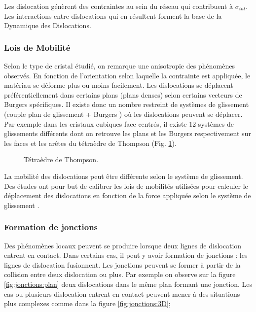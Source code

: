 \documentclass[11pt,class=article,float=false,crop=false]{standalone}
\begin{document}

Les dislocation génèrent des contraintes au sein du réseau qui contribuent à $\sigma _{int}$. Les interactions entre dislocations qui en résultent forment la base de la Dynamique des Dislocations.

\subsubsection{Lois de Mobilité}
Selon le type de cristal étudié, on remarque une anisotropie des phénomènes observés. En fonction de l'orientation selon laquelle la contrainte est appliquée, le matériau se déforme plus ou moins facilement. Les dislocations se déplacent préférentiellement dans certains plans (plans denses) selon certains vecteurs de Burgers spécifiques. Il existe donc un nombre restreint de systèmes de glissement (couple plan de glissement + Burgers ) où les dislocations peuvent se déplacer. Par exemple dans les cristaux cubiques face centrés, il existe 12 systèmes de glissements différents dont on retrouve les plans et les Burgers respectivement sur les faces et les arêtes du tétraèdre de Thompson (Fig. \ref{fig:Thompson_tetra}).

\begin{figure}[H]
	\centering
	\caption{Tétraèdre de Thompson.}
	\label{fig:Thompson_tetra}
\end{figure}

La mobilité des dislocations peut être différente selon le système de glissement. Des études ont pour but de calibrer les lois de mobilités utilisées pour calculer le déplacement des dislocations en fonction de la force appliquée selon le système de glissement .

\subsubsection{Formation de jonctions}
Des phénomènes locaux peuvent se produire lorsque deux lignes de dislocation entrent en contact. Dans certains cas, il peut y avoir formation de jonctions : les lignes de dislocation fusionnent. Les jonctions peuvent se former à partir de la collision entre deux dislocation ou plus. Par exemple on observe sur la figure \ref{fig:jonctions:plan} deux dislocations dans le même plan formant une jonction. Les cas ou plusieurs dislocation entrent en contact peuvent mener à des situations plus complexes comme dans la figure \ref{fig:jonctions:3D};
\end{document}
